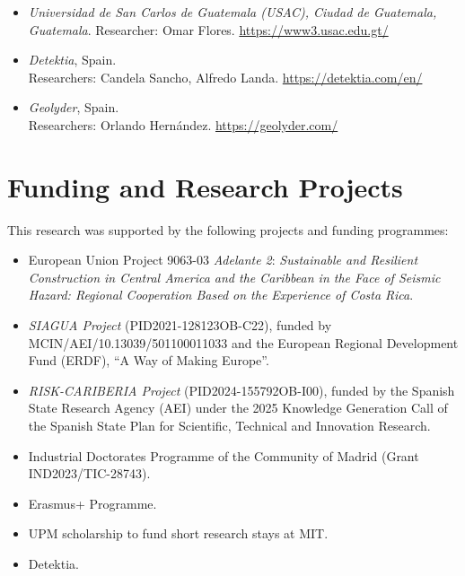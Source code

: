 \begin{itemize}
    \item \textit{Universidad de San Carlos de Guatemala (USAC), Ciudad de Guatemala, Guatemala}.
    Researcher: Omar Flores.
    \url{https://www3.usac.edu.gt/}
    
    \item \textit{Detektia}, Spain. \\
    Researchers: Candela Sancho, Alfredo Landa.
    \url{https://detektia.com/en/}
    
    \item \textit{Geolyder}, Spain. \\
    Researchers: Orlando Hernández.
    \url{https://geolyder.com/}
        
\end{itemize}

\section*{Funding and Research Projects}

This research was supported by the following projects and funding programmes:

\begin{itemize}

    \item European Union Project 9063-03 \emph{Adelante 2}: \emph{Sustainable and Resilient Construction in Central America and the Caribbean in the Face of Seismic Hazard: Regional Cooperation Based on the Experience of Costa Rica}.
    
    \item \emph{SIAGUA Project} (PID2021-128123OB-C22), funded by MCIN/AEI/10.13039/501100011033 and the European Regional Development Fund (ERDF), ``A Way of Making Europe''.
    
    \item \emph{RISK-CARIBERIA Project} (PID2024-155792OB-I00), funded by the Spanish State Research Agency (AEI) under the 2025 Knowledge Generation Call of the Spanish State Plan for Scientific, Technical and Innovation Research.
    
    \item Industrial Doctorates Programme of the Community of Madrid (Grant IND2023/TIC-28743).
    
    \item Erasmus+ Programme.

    \item UPM scholarship to fund short research stays at MIT.

    \item Detektia.
    
\end{itemize}
